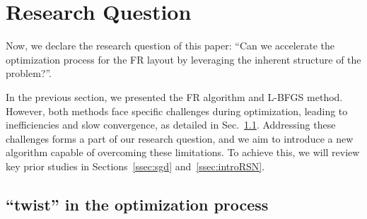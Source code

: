 \documentclass[dvipdfmx,lettersize,journal]{IEEEtran}
\begin{document}
\section{Research Question}\label{sec:RQ}

Now, we declare the research question of this paper: ``Can we accelerate the optimization process for the FR layout by leveraging the inherent structure of the problem?''.

In the previous section, we presented the FR algorithm and L-BFGS method. However, both methods face specific challenges during optimization, leading to inefficiencies and slow convergence, as detailed in Sec.~\ref{ssec:twist}.
Addressing these challenges forms a part of our research question, and we aim to introduce a new algorithm capable of overcoming these limitations. To achieve this, we will review key prior studies in Sections~\ref{ssec:sgd} and~\ref{ssec:introRSN}.

\subsection{``twist'' in the optimization process}\label{ssec:twist}
\end{document}
